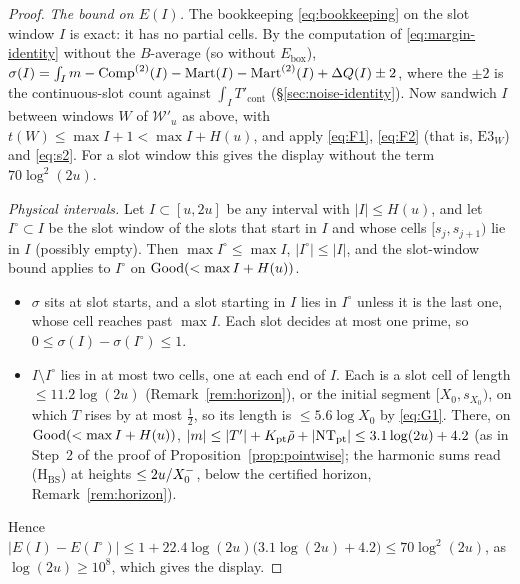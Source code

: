 \begin{proof}
\emph{The bound on $E(I)$.} The bookkeeping \eqref{eq:bookkeeping} on the slot window $I$ is exact: it has no partial cells. By the
computation of \eqref{eq:margin-identity} without the $B$-average (so without $E_{\mathrm{box}}$),
$\sigma(I)=\int_Im-\mathrm{Comp}^{(2)}(I)-\mathrm{Mart}(I)-\mathrm{Mart}^{(2)}(I)+\Delta Q(I)\pm2$, where the $\pm2$ is the continuous-slot count against
$\int_IT'_{\mathrm{cont}}$ (\S\ref{sec:noise-identity}). Now sandwich $I$ between windows $W$ of
$\mathcal W'_u$ as above, with $t(W)\le\max I+1<\max I+H(u)$, and apply \eqref{eq:F1}, \eqref{eq:F2} (that is, $\mathrm{E3}_W$) and
\eqref{eq:s2}. For a slot window this gives the display without the term $70\log^2(2u)$.

\emph{Physical intervals.} Let $I\subset[u,2u]$ be any interval with $|I|\le H(u)$, and let $I^\circ\subset I$ be the slot window of the
slots that start in $I$ and whose cells $[s_j,s_{j+1})$ lie in $I$ (possibly empty). Then $\max I^\circ\le\max I$, $|I^\circ|\le|I|$, and the slot-window
bound applies to $I^\circ$ on $\mathrm{Good}(<\max I+H(u))$.
\begin{itemize}
\item $\sigma$ sits at slot starts, and a slot starting in $I$ lies in $I^\circ$ unless it is the last one, whose cell reaches past
  $\max I$. Each slot decides at most one prime, so $0\le\sigma(I)-\sigma(I^\circ)\le1$.
\item $I\setminus I^\circ$ lies in at most two cells, one at each end of $I$. Each is a slot cell of length
  $\le11.2\log(2u)$ (Remark~\ref{rem:horizon}), or the initial segment $[X_0,s_{X_0})$, on which $T$ rises by at most $\frac12$, so
  its length is $\le5.6\log X_0$ by \eqref{eq:G1}. There, on $\mathrm{Good}(<\max I+H(u))$, $|m|\le|T'|+K_{\mathrm{pt}}\tilde\rho+|\mathrm{NT}_{\mathrm{pt}}|\le3.1\log(2u)+4.2$
  (as in Step~2 of the proof of Proposition~\ref{prop:pointwise}; the harmonic sums read \textup{(H$_{\mathrm{BS}}$)} at heights
  $\le2u/X_0^{-}$, below the certified horizon, Remark~\ref{rem:horizon}).
\end{itemize}
Hence $|E(I)-E(I^\circ)|\le1+22.4\log(2u)\bigl(3.1\log(2u)+4.2\bigr)\le70\log^2(2u)$, as $\log(2u)\ge10^8$, which gives the display.
\end{proof}

